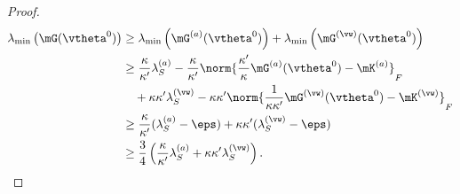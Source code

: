 \documentclass{article}
\begin{document}
\begin{proof}
    \begin{equation}
        \begin{aligned}
            \lambda_{\min}\left(\mG(\vtheta^0)\right)
             & \geq\lambda_{\min}\left(\mG^{(a)}(\vtheta^0)\right) + \lambda_{\min}\left(\mG^{(\vw)}(\vtheta^0)\right)                          \\
             & \geq\frac{\kappa}{\kappa'}\lambda_S^{(a)}-\frac{\kappa}{\kappa'} \norm{\frac{\kappa'}{\kappa}\mG^{(a)}(\vtheta^0) - \mK^{(a)}}_F \\
             & \quad + \kappa\kappa'\lambda_S^{(\vw)} - \kappa\kappa'\norm{\frac{1}{\kappa\kappa'}\mG^{(\vw)}(\vtheta^0) - \mK^{(\vw)}}_F       \\
             & \geq\frac{\kappa}{\kappa'}(\lambda_S^{(a)}-\eps)+\kappa\kappa'(\lambda_S^{(\vw)}-\eps)                                           \\
             & \geq\frac{3}{4}\left(\frac{\kappa}{\kappa'}\lambda_S^{(a)}+\kappa\kappa'\lambda_S^{(\vw)}\right).
        \end{aligned}
    \end{equation}
\end{proof}
\end{document}
